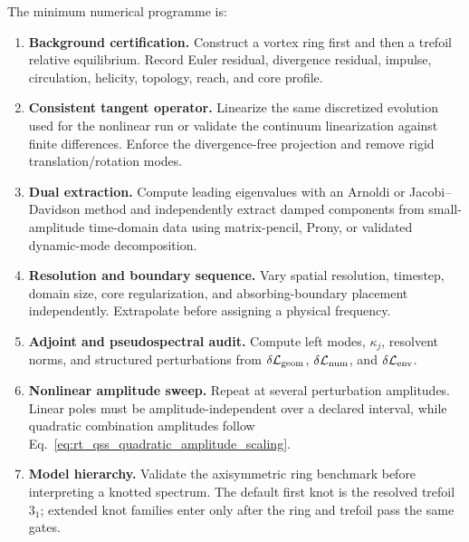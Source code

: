         The minimum numerical programme is:
        \begin{enumerate}
            \item \textbf{Background certification.}
            Construct a vortex ring first and then a trefoil relative equilibrium.
            Record Euler residual, divergence residual, impulse, circulation, helicity,
            topology, reach, and core profile.

            \item \textbf{Consistent tangent operator.}
            Linearize the same discretized evolution used for the nonlinear run or
            validate the continuum linearization against finite differences.  Enforce
            the divergence-free projection and remove rigid translation/rotation modes.

            \item \textbf{Dual extraction.}
            Compute leading eigenvalues with an Arnoldi or Jacobi--Davidson method and
            independently extract damped components from small-amplitude time-domain
            data using matrix-pencil, Prony, or validated dynamic-mode decomposition.

            \item \textbf{Resolution and boundary sequence.}
            Vary spatial resolution, timestep, domain size, core regularization, and
            absorbing-boundary placement independently.  Extrapolate before assigning
            a physical frequency.

            \item \textbf{Adjoint and pseudospectral audit.}
            Compute left modes, \(\kappa_j\), resolvent norms, and structured
            perturbations from
            \(\delta\mathcal L_{\rm geom}\),
            \(\delta\mathcal L_{\rm num}\), and
            \(\delta\mathcal L_{\rm env}\).

            \item \textbf{Nonlinear amplitude sweep.}
            Repeat at several perturbation amplitudes.  Linear poles must be
            amplitude-independent over a declared interval, while quadratic
            combination amplitudes follow
            Eq.~\eqref{eq:rt_qss_quadratic_amplitude_scaling}.

            \item \textbf{Model hierarchy.}
            Validate the axisymmetric ring benchmark before interpreting a knotted
            spectrum.  The default first knot is the resolved trefoil \(3_1\); extended
            knot families enter only after the ring and trefoil pass the same gates.
        \end{enumerate}

